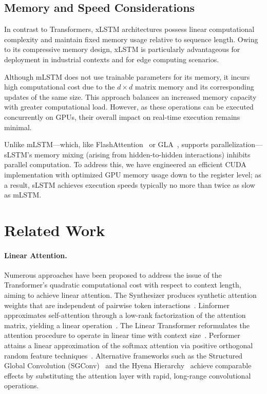 \subsection{Memory and Speed Considerations}

In contrast to Transformers, xLSTM architectures possess linear computational complexity and maintain fixed memory usage relative to sequence length. Owing to its compressive memory design, xLSTM is particularly advantageous for deployment in industrial contexts and for edge computing scenarios.

Although mLSTM does not use trainable parameters for its memory, it incurs high computational cost due to the $d \times d$ matrix memory and its corresponding updates of the same size. This approach balances an increased memory capacity with greater computational load. However, as these operations can be executed concurrently on GPUs, their overall impact on real-time execution remains minimal.

Unlike mLSTM—which, like FlashAttention~\citep{Dao:22,Dao:23} or GLA~\citep{Yang:23arxiv}, supports parallelization—sLSTM’s memory mixing (arising from hidden-to-hidden interactions) inhibits parallel computation. To address this, we have engineered an efficient CUDA implementation with optimized GPU memory usage down to the register level; as a result, sLSTM achieves execution speeds typically no more than twice as slow as mLSTM.

\section{Related Work}
\label{sec:related}

\paragraph{Linear Attention.} Numerous approaches have been proposed to address the issue of the Transformer's quadratic computational cost with respect to context length, aiming to achieve linear attention. The Synthesizer produces synthetic attention weights that are independent of pairwise token interactions~\citep{Tay:20arxiv}. Linformer approximates self-attention through a low-rank factorization of the attention matrix, yielding a linear operation~\citep{Wang:20arxiv}. The Linear Transformer reformulates the attention procedure to operate in linear time with context size~\citep{Katharopoulos:20}. Performer attains a linear approximation of the softmax attention via positive orthogonal random feature techniques~\citep{Choromanski:21}. Alternative frameworks such as the Structured Global Convolution (SGConv)~\citep{Li:22} and the Hyena Hierarchy~\citep{Poli:23} achieve comparable effects by substituting the attention layer with rapid, long-range convolutional operations.

